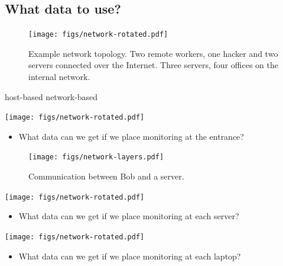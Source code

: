 \subsection{What data to use?}

\begin{frame}
  \begin{figure}
    \texttt{[image: figs/network-rotated.pdf]}
    \caption{Example network topology.
      Two remote workers, one hacker and two servers connected over the 
      Internet.
      Three servers, four offices on the internal network.
    }
  \end{figure}
\end{frame}
host-based
network-based

\begin{frame}
  \centering
  \texttt{[image: figs/network-rotated.pdf]}
  \begin{question}
    \begin{itemize}
      \item What data can we get if we place monitoring at the entrance?
    \end{itemize}
  \end{question}
\end{frame}

\begin{frame}
  \begin{figure}
    \texttt{[image: figs/network-layers.pdf]}
    \caption{Communication between Bob and a server.}
  \end{figure}
\end{frame}

\begin{frame}
  \centering
  \texttt{[image: figs/network-rotated.pdf]}
  \begin{question}
    \begin{itemize}
      \item What data can we get if we place monitoring at each server?
    \end{itemize}
  \end{question}
\end{frame}

\begin{frame}
  \centering
  \texttt{[image: figs/network-rotated.pdf]}
  \begin{question}
    \begin{itemize}
      \item What data can we get if we place monitoring at each laptop?
    \end{itemize}
  \end{question}
\end{frame}

